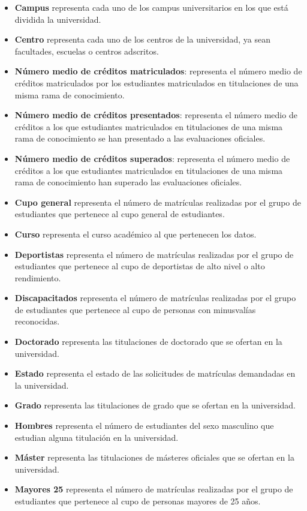 \begin{itemize}
	\item \textbf{Campus} representa cada uno de los campus universitarios en los que está dividida la universidad.
	\item \textbf{Centro} representa cada uno de los centros de la universidad, ya sean facultades, escuelas o centros adscritos.
	\item \textbf{Número medio de créditos matriculados}: representa el número medio de créditos matriculados por los estudiantes matriculados en titulaciones de una misma rama de conocimiento.
	\item \textbf{Número medio de créditos presentados}: representa el número medio de créditos a los que estudiantes matriculados en titulaciones de una misma rama de conocimiento se han presentado a las evaluaciones oficiales.
	\item \textbf{Número medio de créditos superados}: representa el número medio de créditos a los que estudiantes matriculados en titulaciones de una misma rama de conocimiento han superado las evaluaciones oficiales.
	\item \textbf{Cupo general} representa el número de matrículas realizadas por el grupo de estudiantes que pertenece al cupo general de estudiantes.
	\item \textbf{Curso} representa el curso académico al que pertenecen los datos.
	\item \textbf{Deportistas} representa el número de matrículas realizadas por el grupo de estudiantes que pertenece al cupo de deportistas de alto nivel o alto rendimiento.
	\item \textbf{Discapacitados} representa el número de matrículas realizadas por el grupo de estudiantes que pertenece al cupo de personas con minusvalías reconocidas.
	\item \textbf{Doctorado} representa las titulaciones de doctorado que se ofertan en la universidad.
	\item \textbf{Estado} representa el estado de las solicitudes de matrículas demandadas en la universidad.
	\item \textbf{Grado} representa las titulaciones de grado que se ofertan en la universidad.
	\item \textbf{Hombres} representa el número de estudiantes del sexo masculino que estudian alguna titulación en la universidad.
	\item \textbf{Máster} representa las titulaciones de másteres oficiales que se ofertan en la universidad.
	\item \textbf{Mayores 25} representa el número de matrículas realizadas por el grupo de estudiantes que pertenece al cupo de personas mayores de 25 años.

\end{itemize}

